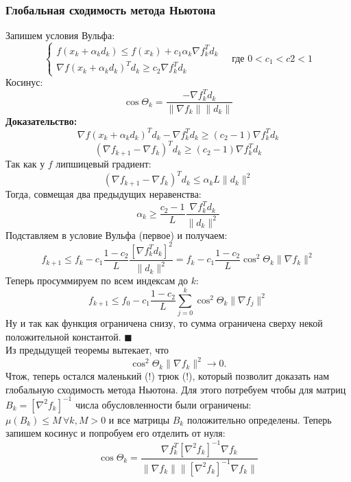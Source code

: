 \subsubsection{Глобальная сходимость метода Ньютона}
Запишем условия Вульфа:
\[
		\begin{cases}
			f(x_k + \alpha_k d_k) \leq f(x_k) + c_1 \alpha_k \nabla f_k^{T} d_k \\
			\nabla f(x_k + \alpha_k d_k)^{T} d_k \geq c_2 \nabla f_{k}^{T} d_k
		\end{cases}
		\quad \text{где } 0 < c_1 < c2 < 1
\]
Косинус:
\[
		\cos \Theta_k = \dfrac{-\nabla f_k^{T} d_k}{\| \nabla f_k \|  \| d_k \|}
\]
\textbf{Доказательство:} \\
\[
		\nabla f(x_k + \alpha_k d_k)^T d_k - \nabla f_k^{T} d_k \geq (c_2 - 1) \nabla f_k^{T} d_k
\]
\[
		\left( \nabla f_{k + 1} - \nabla f_{k} \right)^{T} d_k \geq (c_2 - 1) \nabla f_k^{T} d_k
\]
Так как у $f$ липшицевый градиент:
\[
		\left( \nabla f_{k + 1} - \nabla f_{k} \right)^{T} d_k \leq \alpha_k L \| d_k \|^2
\]
Тогда, совмещая два предыдущих неравенства:
\[
		\alpha_k \geq \dfrac{c_2 - 1}{L} \dfrac{\nabla f_{k}^{T} d_k}{\| d_k \|^2}
\]
Подставляем в условие Вульфа (первое) и получаем:
\[
		f_{k + 1} \leq f_{k} - c_1 \dfrac{1 - c_2}{L} \dfrac{\left[\nabla f_{k}^{T} d_k\right]^2}{\| d_k \|^2} = f_k - c_1 \dfrac{1 - c_2}{L} \cos^2 \Theta_k \| \nabla f_k \|^2
\]
Теперь просуммируем по всем индексам до $k$:
\[
		f_{k + 1} \leq f_{0} - c_1 \dfrac{1 - c_2}{L} \sum\limits_{j=0}^{k} \cos^2 \Theta_k \| \nabla f_j \|^2
\]
Ну и так как функция ограничена снизу, то сумма ограничена сверху некой положительной константой.
\hfill$\scriptstyle\blacksquare$
\vspace{0.5cm}
\\
Из предыдущей теоремы вытекает, что
\[
		\cos^2 \Theta_k \| \nabla f_k \|^2 \to 0.
\]
Чтож, теперь остался маленький (!) трюк (!), который позволит доказать нам глобальную сходимость метода Ньютона. Для этого потребуем чтобы для матриц $B_k = \left[ \nabla^2 f_k \right]^{-1}$ числа обусловленности были ограничены: $\mu(B_k) \leq M \, \forall k, M > 0$ и все матрицы $B_k$ положительно определены. Теперь запишем косинус и попробуем его отделить от нуля: \\
\[
		\cos \Theta_k = \dfrac{\nabla f_k^{T} \left[ \nabla^2 f_k \right]^{-1} \nabla f_k}{\| \nabla f_k \| \| \left[ \nabla^2 f_k \right]^{-1} \nabla f_k \|}
\]
